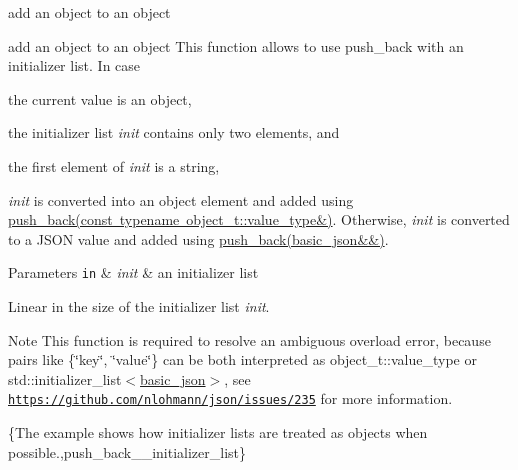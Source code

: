 add an object to an object 

add an object to an object This function allows to use {\ttfamily push\+\_\+back} with an initializer list. In case


\begin{DoxyEnumerate}
\item the current value is an object,
\item the initializer list {\itshape init} contains only two elements, and
\item the first element of {\itshape init} is a string,
\end{DoxyEnumerate}

{\itshape init} is converted into an object element and added using \mbox{\hyperlink{classnlohmann_1_1basic__json_ae11a3a51782c058fff2f6550cdfb9b3c}{push\+\_\+back(const typename object\+\_\+t\+::value\+\_\+type\&)}}. Otherwise, {\itshape init} is converted to a J\+S\+ON value and added using \mbox{\hyperlink{classnlohmann_1_1basic__json_ac8e523ddc8c2dd7e5d2daf0d49a9c0d7}{push\+\_\+back(basic\+\_\+json\&\&)}}.


\begin{DoxyParams}[1]{Parameters}
\mbox{\tt in}  & {\em init} & an initializer list\\
\hline
\end{DoxyParams}
Linear in the size of the initializer list {\itshape init}.

\begin{DoxyNote}{Note}
This function is required to resolve an ambiguous overload error, because pairs like {\ttfamily \{\char`\"{}key\char`\"{}, \char`\"{}value\char`\"{}\}} can be both interpreted as {\ttfamily object\+\_\+t\+::value\+\_\+type} or {\ttfamily std\+::initializer\+\_\+list$<$\mbox{\hyperlink{classnlohmann_1_1basic__json}{basic\+\_\+json}}$>$}, see \href{https://github.com/nlohmann/json/issues/235}{\tt https\+://github.\+com/nlohmann/json/issues/235} for more information.
\end{DoxyNote}
\{The example shows how initializer lists are treated as objects when possible.,push\+\_\+back\+\_\+\+\_\+initializer\+\_\+list\} \mbox{\label{classnlohmann_1_1basic__json_a849368ca71af3a93d576939d486f61c7}} 
